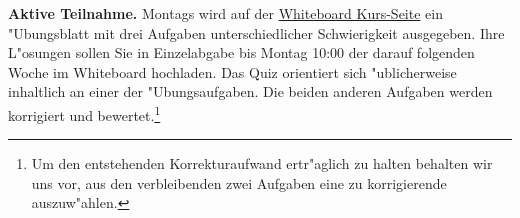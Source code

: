 \documentclass[a4,11pt]{article}
\begin{document}
{\bfseries Aktive Teilnahme.} 
\newline
Montags wird auf der
\href{https://mycampus.imp.fu-berlin.de/x/wPdhCU}{Whiteboard Kurs-Seite} 
ein "Ubungsblatt mit drei
Aufgaben unterschiedlicher Schwierigkeit ausgegeben.
Ihre L"osungen sollen Sie {in Einzelabgabe} %
bis Montag 10:00 der darauf folgenden Woche im Whiteboard hochladen. Das Quiz
orientiert sich "ublicherweise inhaltlich an einer der "Ubungsaufgaben.
Die beiden anderen Aufgaben werden korrigiert und bewertet.\footnote{%
Um den entstehenden Korrekturaufwand ertr"aglich zu halten behalten wir uns vor,
aus den verbleibenden zwei Aufgaben eine zu korrigierende auszuw"ahlen.}
\end{document}
